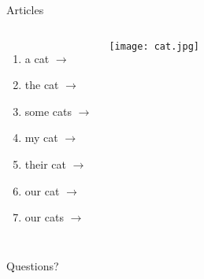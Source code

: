 \documentclass{beamer}
\begin{document}
  \begin{frame}{Articles }
    \begin{columns}
        \begin{enumerate}
          \item a cat $\to$ \underline{}
          \item the cat $\to$ \underline{}
          \item some cats $\to$ \underline{}
          \item my cat $\to$ \underline{}
          \item their cat $\to$ \underline{}
          \item our cat $\to$ \underline{}
          \item our cat\alert{s} $\to$ \underline{}
        \end{enumerate}
        \texttt{[image: cat.jpg]}
    \end{columns}
  \end{frame}

  \begin{frame}{}
    \begin{center}
      \Large Questions?
    \end{center}
  \end{frame}
\end{document}
